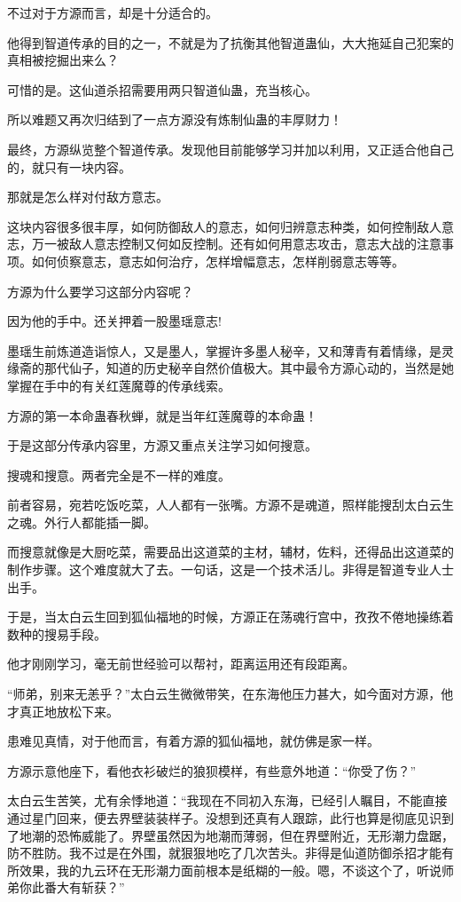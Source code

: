 \begin{this_body}
不过对于方源而言，却是十分适合的。

他得到智道传承的目的之一，不就是为了抗衡其他智道蛊仙，大大拖延自己犯案的真相被挖掘出来么？

可惜的是。这仙道杀招需要用两只智道仙蛊，充当核心。

所以难题又再次归结到了一点方源没有炼制仙蛊的丰厚财力！

最终，方源纵览整个智道传承。发现他目前能够学习并加以利用，又正适合他自己的，就只有一块内容。

那就是怎么样对付敌方意志。

这块内容很多很丰厚，如何防御敌人的意志，如何归辨意志种类，如何控制敌人意志，万一被敌人意志控制又何如反控制。还有如何用意志攻击，意志大战的注意事项。如何侦察意志，意志如何治疗，怎样增幅意志，怎样削弱意志等等。

方源为什么要学习这部分内容呢？

因为他的手中。还关押着一股墨瑶意志!

墨瑶生前炼道造诣惊人，又是墨人，掌握许多墨人秘辛，又和薄青有着情缘，是灵缘斋的那代仙子，知道的历史秘辛自然价值极大。其中最令方源心动的，当然是她掌握在手中的有关红莲魔尊的传承线索。

方源的第一本命蛊春秋蝉，就是当年红莲魔尊的本命蛊！

于是这部分传承内容里，方源又重点关注学习如何搜意。

搜魂和搜意。两者完全是不一样的难度。

前者容易，宛若吃饭吃菜，人人都有一张嘴。方源不是魂道，照样能搜刮太白云生之魂。外行人都能插一脚。

而搜意就像是大厨吃菜，需要品出这道菜的主材，辅材，佐料，还得品出这道菜的制作步骤。这个难度就大了去。一句话，这是一个技术活儿。非得是智道专业人士出手。

于是，当太白云生回到狐仙福地的时候，方源正在荡魂行宫中，孜孜不倦地操练着数种的搜易手段。

他才刚刚学习，毫无前世经验可以帮衬，距离运用还有段距离。

“师弟，别来无恙乎？”太白云生微微带笑，在东海他压力甚大，如今面对方源，他才真正地放松下来。

患难见真情，对于他而言，有着方源的狐仙福地，就仿佛是家一样。

方源示意他座下，看他衣衫破烂的狼狈模样，有些意外地道：“你受了伤？”

太白云生苦笑，尤有余悸地道：“我现在不同初入东海，已经引人瞩目，不能直接通过星门回来，便去界壁装装样子。没想到还真有人跟踪，此行也算是彻底见识到了地潮的恐怖威能了。界壁虽然因为地潮而薄弱，但在界壁附近，无形潮力盘踞，防不胜防。我不过是在外围，就狠狠地吃了几次苦头。非得是仙道防御杀招才能有所效果，我的九云环在无形潮力面前根本是纸糊的一般。嗯，不谈这个了，听说师弟你此番大有斩获？”


\end{this_body}
